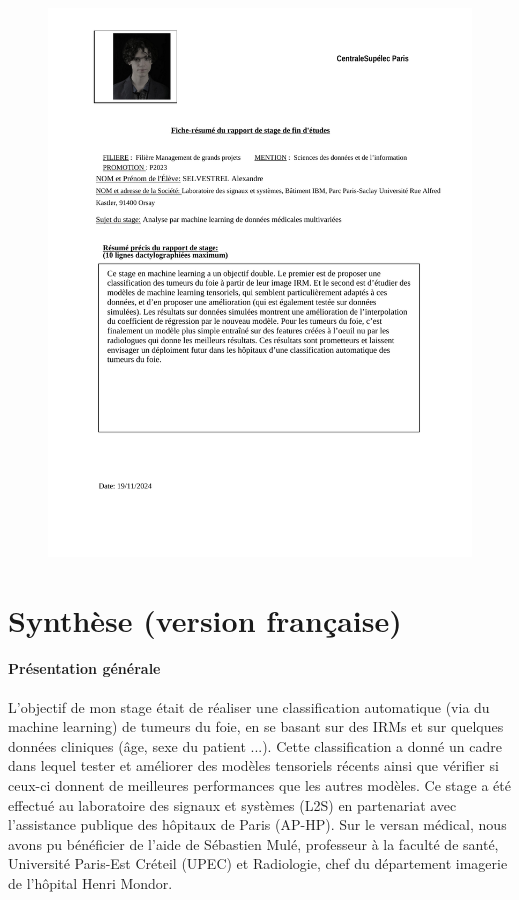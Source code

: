 \documentclass[preprint,12pt]{elsarticle}
\begin{document}
\newpage
\pagestyle{plain}
\noindent 
\begin{figure}[H]
    \centering
    \includegraphics[scale = 0.85]{images/resume.pdf}
    \label{fig:odt_page}
\end{figure}

\newpage
{}
\section*{Synthèse (version française)}
\vspace*{10 pt}
\paragraph*{Présentation générale} L'objectif de mon stage était de réaliser une classification automatique (via du machine learning) de tumeurs du foie, en se basant sur des IRMs et sur quelques données cliniques (âge, sexe du patient ...). Cette classification a donné un cadre dans lequel tester et améliorer des modèles tensoriels récents \cite{multi_rank_1,multi_rank_r} ainsi que vérifier si ceux-ci donnent de meilleures performances que les autres modèles. Ce stage a été effectué au laboratoire des signaux et systèmes (L2S) en partenariat avec l'assistance publique des hôpitaux de Paris (AP-HP). Sur le versan médical, nous avons pu bénéficier de l'aide de Sébastien Mulé, professeur à la faculté de santé, Université Paris-Est Créteil (UPEC) et Radiologie, chef du département imagerie de l'hôpital Henri Mondor.
\end{document}
